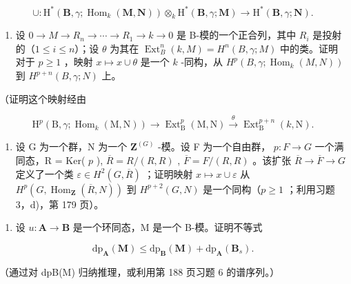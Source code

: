 \[
\cup : \mathrm{H} ^ {*} (\mathbf {B}, \gamma ; \operatorname{Hom} _ {k} (\mathbf {M}, \mathbf {N})) \otimes_ {k} \mathrm{H} ^ {*} (\mathbf {B}, \gamma ; \mathbf {M}) \rightarrow \mathrm{H} ^ {*} (\mathbf {B}, \gamma ; \mathbf {N}).
\]

\begin{enumerate}
\def\labelenumi{\alph{enumi})}
\setcounter{enumi}{1}
\tightlist
\item
  设 \(0 \to M \to R_n \to \cdots \to R_1 \to k \to 0\) 是 B-模的一个正合列，其中 \(R_i\) 是投射的（\(1 \leqslant i \leqslant n\)）；设 \(\theta\) 为其在 \(\operatorname{Ext}_B^n(k, M) = H^n(B, \gamma; M)\) 中的类。证明对于 \(p \geqslant 1\) ，映射 \(x \mapsto x \cup \theta\) 是一个 \(k\) -同构，从 \(H^p(B, \gamma; \operatorname{Hom}_k(M, N))\) 到 \(H^{p+n}(B, \gamma; N)\) 上。
\end{enumerate}

（证明这个映射经由

\[
\mathrm{H} ^ {p} (\mathrm{B}, \gamma ; \operatorname{Hom} _ {k} (\mathrm{M}, \mathrm{N})) \rightarrow \operatorname{Ext} _ {\mathrm{B}} ^ {p} (\mathrm{M}, \mathrm{N}) \xrightarrow {\theta} \operatorname{Ext} _ {\mathrm{B}} ^ {p + n} (k, \mathrm{N}).
\]

\begin{enumerate}
\def\labelenumi{\alph{enumi})}
\setcounter{enumi}{2}
\tightlist
\item
  设 G 为一个群，N 为一个 \(\mathbf{Z}^{(G)}\) -模。设 F 为一个自由群， \(p: F \to G\) 一个满同态，R = Ker( \(p\) ), \(\overline{R} = R/(R, R)\) , \(\overline{F} = F/(R, R)\) 。该扩张 \(\overline{R} \to \overline{F} \to G\) 定义了一个类 \(\varepsilon \in H^2(G, \overline{R})\) ；证明映射 \(x \mapsto x \cup \varepsilon\) 从 \(H^p(G, \operatorname{Hom}_{\mathbf{Z}}(\overline{R}, N))\) 到 \(H^{p+2}(G, N)\) 是一个同构（\(p \geqslant 1\) ；利用习题 3，d)，第 179 页）。
\end{enumerate}


\begin{enumerate}
\def\labelenumi{\arabic{enumi})}
\tightlist
\item
  设 \(u: \mathbf{A} \to \mathbf{B}\) 是一个环同态，M 是一个 B-模。证明不等式
\end{enumerate}

\[
\mathrm{dp} _ {\mathbf {A}} (\mathbf {M}) \leqslant \mathrm{dp} _ {\mathbf {B}} (\mathbf {M}) + \mathrm{dp} _ {\mathbf {A}} (\mathbf {B} _ {s}).
\]

（通过对 dpB(M) 归纳推理，或利用第 188 页习题 6 的谱序列。）

